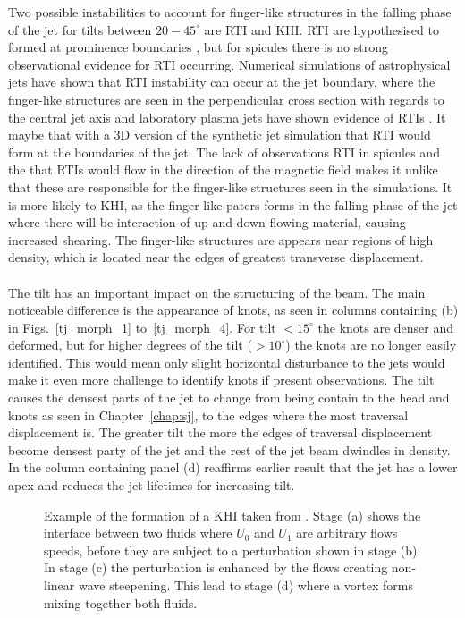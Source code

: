\documentclass[12pt]{ociamthesis}
\newcommand{\mfig}[4]{
  \begin{figure}
  \begin{center}
  \texttt{[image: \#2]}
  \caption{#3}
  \label{#4}
  \end{center}
  \end{figure}}
\newcommand{\np}{\\ \\}
\newcommand{\degs}{^{\circ}}
\begin{document}
Two possible instabilities to account for finger-like structures in the falling phase of the jet for tilts between $20-45\degs$ are RTI and KHI. RTI are hypothesised to formed at prominence boundaries \citep{Berger2008ApJ676L89B,Berger2010ApJ7161288B,Hillier2012ApJ746120H,Berger2017ApJ85060B}, but for spicules there is no strong observational evidence for RTI occurring. Numerical simulations of astrophysical jets have shown that RTI instability can occur at the jet boundary, where the finger-like structures are seen in the perpendicular cross section with regards to the central jet axis \citep{Toma2017MNRAS4721253T,Matsumoto2017MNRAS4721421M} and laboratory plasma jets have shown evidence of RTIs \citep{Zhai2016PhPl23c2121Z}. It maybe that with a 3D version of the synthetic jet simulation that RTI would form at the boundaries of the jet. The lack of observations RTI in spicules and the that RTIs would flow in the direction of the magnetic field makes it unlike that these are responsible for the finger-like structures seen in the simulations. It is more likely to KHI, as the finger-like paters forms in the falling phase of the jet where there will be interaction of up and down flowing material, causing increased shearing. The finger-like structures are appears near regions of high density, which is located near the edges of greatest transverse displacement.     \np
%
The tilt has an important impact on the structuring of the beam. The main noticeable difference is the appearance of knots, as seen in columns containing (b) in Figs.~\ref{tj_morph_1} to~\ref{tj_morph_4}. For tilt $<15\degs$ the knots are denser and deformed, but for higher degrees of the tilt ($> 10^{\circ}$) the knots are no longer easily identified. This would mean only slight horizontal disturbance to the jets would make it even more challenge to identify knots if present observations. The tilt causes the densest parts of the jet to change from being contain to the head and knots as seen in Chapter~\ref{chap:sj}, to the edges where the most traversal displacement is. The greater tilt the more the edges of traversal displacement become densest party of the jet and the rest of the jet beam dwindles in density. In the column containing panel (d) reaffirms earlier result that the jet has a lower apex and reduces the jet lifetimes for increasing tilt.
%
\begin{figure}
\captionsetup[subfigure]{labelformat=empty}
\centering
{}
\caption{Example of the formation of a KHI taken from \cite{Barbulescu2018SoPh29386B}. Stage (a) shows the interface between two fluids where $U_0$ and $U_1$ are arbitrary flows speeds, before they are subject to a perturbation shown in stage (b). In stage (c) the perturbation is enhanced by the flows creating non-linear wave steepening. This lead to stage (d) where a vortex forms mixing together both fluids. }
\label{KHI_example}
\end{figure}
\end{document}
